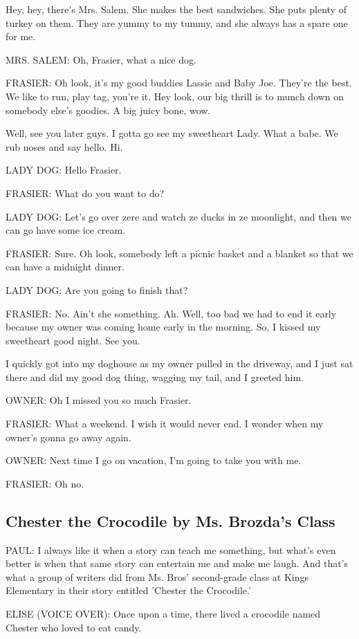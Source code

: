 Hey, hey, there's Mrs. Salem.
She makes the best sandwiches.
She puts plenty of turkey on them.
They are yummy to my tummy, and she always has a spare one for me.

MRS. SALEM:
Oh, Frasier, what a nice dog.

FRASIER:
Oh look, it's my good buddies Lassie and Baby Joe.
They're the best.
We like to run, play tag, you're it.
Hey look, our big thrill is to munch down on somebody else's goodies.
A big juicy bone, wow.

Well, see you later guys.
I gotta go see my sweetheart Lady.
What a babe.
We rub noses and say hello.
Hi.

LADY DOG:
Hello Frasier.

FRASIER:
What do you want to do?

LADY DOG:
Let's go over zere and watch ze ducks in ze moonlight, and then we can go have some ice cream.

FRASIER:
Sure.
Oh look, somebody left a picnic basket and a blanket so that we can have a midnight dinner.

LADY DOG:
Are you going to finish that?

FRASIER:
No.
Ain't she something.
Ah.
Well, too bad we had to end it early because my owner was coming home early in the morning.
So, I kissed my sweetheart good night.
See you.

I quickly got into my doghouse as my owner pulled in the driveway, and I just sat there and did my good dog thing, wagging my tail, and I greeted him.

OWNER:
Oh I missed you so much Frasier.

FRASIER:
What a weekend.
I wish it would never end.
I wonder when my owner's gonna go away again.

OWNER:
Next time I go on vacation, I'm going to take you with me.

FRASIER:
Oh no.

\subsection{Chester the Crocodile by Ms. Brozda's Class}

PAUL:
I always like it when a story can teach me something, but what's even better is when that same story can entertain me and make me laugh.
And that's what a group of writers did from Ms. Bros' second-grade class at Kings Elementary in their story entitled 'Chester the Crocodile.'

ELISE (VOICE OVER):
Once upon a time, there lived a crocodile named Chester who loved to eat candy.

